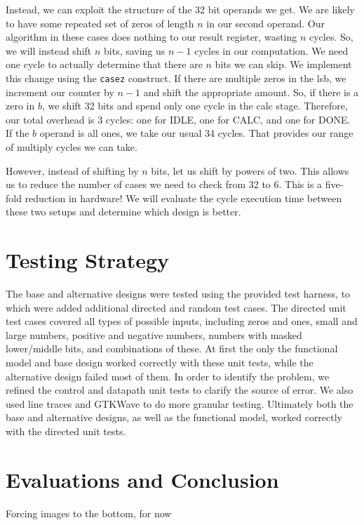 \documentclass[11pt]{article}
\begin{document}
Instead, we can exploit the structure of the 32 bit operands we get.
We are likely to have some repeated set of zeros of length $n$ in our second operand.
Our algorithm in these cases does nothing to our result register, wasting $n$ cycles.
So, we will instead shift $n$ bits, saving us $n-1$ cycles in our computation.
We need one cycle to actually determine that there are $n$ bits we can skip.
We implement this change using the \verb+casez+ construct.
If there are multiple zeros in the lsb, we increment our counter by $n-1$ and shift the appropriate amount.
So, if there is a zero in $b$, we shift 32 bits and spend only one cycle in the calc stage.
Therefore, our total overhead is 3 cycles: one for IDLE, one for CALC, and one for DONE.
If the $b$ operand is all ones, we take our usual 34 cycles.
That provides our range of multiply cycles we can take.

However, instead of shifting by $n$ bits, let us shift by powers of two.
This allows us to reduce the number of cases we need to check from 32 to 6.
This is a five-fold reduction in hardware!
We will evaluate the cycle execution time between these two setups and determine which design is better.   


\section{Testing Strategy}

The base and alternative designs were tested using the provided test harness, to which were added additional directed and random test cases.
The directed unit test cases covered all types of possible inputs, including zeros and ones,
small and large numbers, positive and negative numbers, numbers with masked lower/middle bits, and combinations of these.
At first the only the functional model and base design worked correctly with these unit tests, while the alternative design failed most of them.
In order to identify the problem, we refined the control and datapath unit tests to clarify the source of error.
We also used line traces and GTKWave to do more granular testing.
Ultimately both the base and alternative designs, as well as the functional model, worked correctly with the directed unit tests. 


\section{Evaluations and Conclusion}

Forcing images to the bottom, for now
\end{document}
